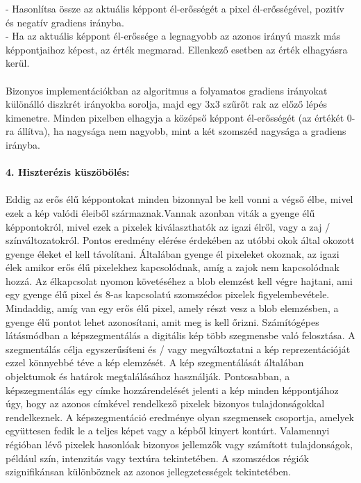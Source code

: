 \indent - Hasonlítsa össze az aktuális képpont él-erősségét a pixel él-erősségével, pozitív és negatív gradiens irányba.\\
\indent - Ha az aktuális képpont él-erőssége a legnagyobb az azonos irányú maszk más képpontjaihoz képest, az érték megmarad. Ellenkező esetben az érték elhagyásra kerül.\\ 
\\
Bizonyos implementációkban az algoritmus a folyamatos gradiens irányokat különálló diszkrét irányokba sorolja, majd egy 3x3 szűrőt rak az előző lépés kimenetre. Minden pixelben elhagyja a középső képpont él-erősségét (az értékét 0-ra állítva), ha nagysága nem nagyobb, mint a két szomszéd nagysága a gradiens irányba.
\\ \\
\textbf{4. Hiszterézis küszöbölés:}\\ \\
Eddig az erős élű képpontokat minden bizonnyal be kell vonni a végső élbe, mivel ezek a kép valódi éleiből származnak.Vannak azonban viták a gyenge élű képpontokról, mivel ezek a pixelek kiválaszthatók az igazi élről, vagy a zaj / színváltozatokról. Pontos eredmény elérése érdekében az utóbbi okok által okozott gyenge éleket el kell távolítani. Általában gyenge él pixeleket okoznak, az igazi élek amikor erős élű pixelekhez kapcsolódnak, amíg a zajok nem kapcsolódnak hozzá. Az élkapcsolat nyomon követéséhez a blob elemzést kell végre hajtani, ami egy gyenge élű pixel és 8-as kapcsolatú szomszédos pixelek figyelembevétele. Mindaddig, amíg van egy erős élű pixel, amely részt vesz a blob elemzésben, a gyenge élű pontot lehet azonosítani, amit meg is kell őrizni.
Számítógépes látásmódban a képszegmentálás a digitális kép több szegmensbe való felosztása. A szegmentálás célja egyszerűsíteni és / vagy megváltoztatni a kép reprezentációját ezzel könnyebbé téve a kép elemzését. A kép szegmentálását általában objektumok és határok megtalálásához használják. Pontosabban, a képszegmentálás egy címke hozzárendelését jelenti a kép minden képpontjához úgy, hogy az azonos címkével rendelkező pixelek bizonyos tulajdonságokkal rendelkeznek. A képszegmentáció eredménye olyan szegmensek csoportja, amelyek együttesen fedik le a teljes képet vagy a képből kinyert kontúrt. Valamennyi régióban lévő pixelek hasonlóak bizonyos jellemzők vagy számított tulajdonságok, például szín, intenzitás vagy textúra tekintetében. A szomszédos régiók szignifikánsan különböznek az azonos jellegzetességek tekintetében.
